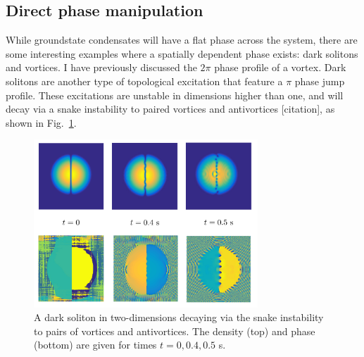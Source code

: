 \subsection{Direct phase manipulation}\label{sec:phase}

While groundstate condensates will have a flat phase across the system, there are some interesting examples where a spatially dependent phase exists: dark solitons and vortices. I have previously discussed the $2\pi$ phase profile of a vortex. Dark solitons are another type of topological excitation that feature a $\pi$ phase jump profile. These excitations are unstable in dimensions higher than one, and will decay via a snake instability to paired vortices and antivortices [citation], as shown in Fig.~\ref{fig:solitons}.

\begin{figure}\centering
    \includegraphics[width=0.75\textwidth]{Images/ch4_vtx/solitons.pdf}
    \caption{A dark soliton in two-dimensions decaying via the snake instability to pairs of vortices and antivortices. The density (top) and phase (bottom) are given for times $t=0,0.4,0.5$ s.}\label{fig:solitons}
\end{figure}

